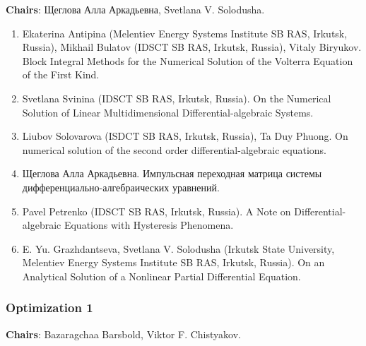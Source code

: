 \documentclass[
]{article}
\providecommand{\tightlist}{%
  \setlength{\itemsep}{0pt}\setlength{\parskip}{0pt}}
\begin{document}
\textbf{Chairs}: Щеглова Алла Аркадьевна, Svetlana V. Solodusha.

\begin{enumerate}
\def\labelenumi{\arabic{enumi}.}
\tightlist
\item
  Ekaterina Antipina (Melentiev Energy Systems Institute SB RAS,
  Irkutsk, Russia), Mikhail Bulatov (IDSCT SB RAS, Irkutsk, Russia),
  Vitaly Biryukov. Block Integral Methods for the Numerical Solution of
  the Volterra Equation of the First Kind.
\item
  Svetlana Svinina (IDSCT SB RAS, Irkutsk, Russia). On the Numerical
  Solution of Linear Multidimensional Differential-algebraic Systems.
\item
  Liubov Solovarova (ISDCT SB RAS, Irkutsk, Russia), Ta Duy Phuong. On
  numerical solution of the second order differential-algebraic
  equations.
\item
  Щеглова Алла Аркадьевна. Импульсная переходная матрица системы
  дифференциально-алгебраических уравнений.
\item
  Pavel Petrenko (IDSCT SB RAS, Irkutsk, Russia). A Note on
  Differential-algebraic Equations with Hysteresis Phenomena.
\item
  E. Yu. Grazhdantseva, Svetlana V. Solodusha (Irkutsk State University,
  Melentiev Energy Systems Institute SB RAS, Irkutsk, Russia). On an
  Analytical Solution of a Nonlinear Partial Differential Equation.
\end{enumerate}

\hypertarget{o1}{%
\subsubsection{Optimization 1}\label{o1}}

\textbf{Chairs}: Bazaragchaa Barsbold, Viktor F. Chistyakov.
\end{document}

